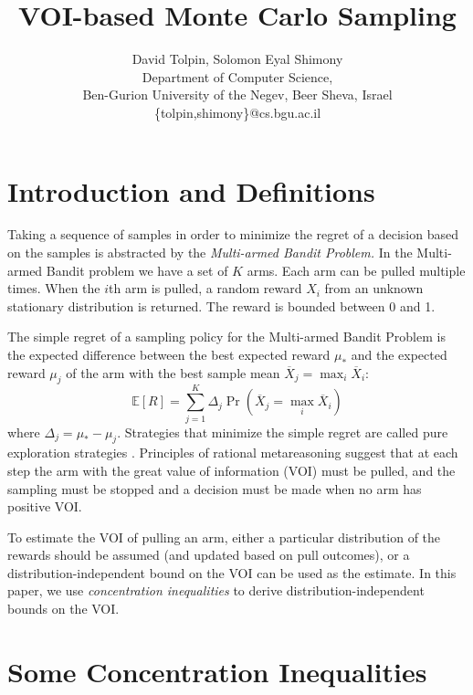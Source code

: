 \documentclass{article}
\title{VOI-based Monte Carlo Sampling}
\author {David Tolpin, Solomon Eyal Shimony \\
Department of Computer Science, \\
Ben-Gurion University of the Negev, Beer Sheva, Israel \\
\{tolpin,shimony\}@cs.bgu.ac.il}
\newcommand {\IE} {\ensuremath {\mathbb{E}}}
\begin{document}
\maketitle

\begin{abstract}
\end{abstract}

\section{Introduction and Definitions}

Taking a sequence of samples in order to minimize the
regret of a decision based on the samples is abstracted by the
{\em Multi-armed Bandit Problem.} In the Multi-armed Bandit problem
we have a set of $K$ arms. Each arm can be pulled multiple
times. When the $i$th arm is pulled, a random reward $X_i$ from an
unknown stationary distribution is returned.  The reward is bounded
between 0 and 1.

The simple regret of a sampling policy for the Multi-armed Bandit
Problem is the expected difference between the best expected reward
$\mu_*$ and the expected reward $\mu_j$ of the arm with the best sample mean
$\overline X_j=\max_i\overline X_i$:
\begin{equation}
\label{eq:simple-regret}
\IE[R]=\sum_{j=1}^K\Delta_j\Pr(\overline X_j=\max_i\overline X_i)
\end{equation}
where $\Delta_j=\mu_*-\mu_j$.
Strategies that minimize the simple regret are called pure exploration
strategies \cite{Bubeck.pure}. Principles of rational metareasoning
\cite{Russel.right} suggest that at each step the arm with the great
value of information (VOI) must be pulled, and the sampling must be
stopped and a decision must be made when no arm has positive VOI. 

To estimate the VOI of pulling an arm, either a particular 
distribution of the rewards should be assumed (and updated based on
pull outcomes), or a distribution-independent bound on the VOI can be
used as the estimate. In this paper, we use {\em concentration inequalities}
to derive distribution-independent bounds on the VOI.

\section{Some Concentration Inequalities}
\end{document}
